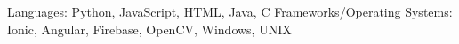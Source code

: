 \begin{cventries}
  \cventry
    {Languages: Python, JavaScript, HTML, Java, C}
    {}
    {}
    {}
    {Frameworks/Operating Systems: Ionic, Angular, Firebase, OpenCV, Windows, UNIX}
    {
    }
\end{cventries}
